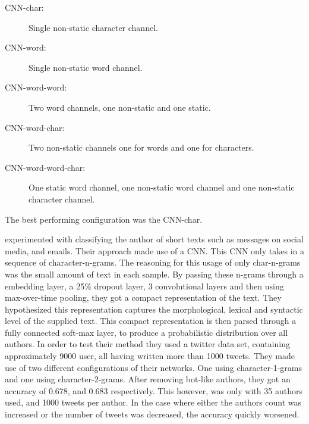 \begin{description}
    \item[CNN-char:] Single non-static character channel.
    \item[CNN-word:] Single non-static word channel.
    \item[CNN-word-word:] Two word channels, one non-static and one static.
    \item[CNN-word-char:] Two non-static channels one for words and one for
        characters.
    \item[CNN-word-word-char:] One static word channel, one non-static word
        channel and one non-static character channel.
\end{description}

The best performing configuration was the CNN-char.

\citet{shrestha2017} experimented with classifying the author of short texts
such as messages on social media, and emails. Their approach made use of a
\gls{CNN}. This \gls{CNN} only takes in a sequence of character-n-grams. The
reasoning for this usage of only char-n-grams was the small amount of text in
each sample. By passing these n-grams through a embedding layer, a 25\% dropout
layer, 3 convolutional layers and then using max-over-time pooling, they got
a compact representation of the text. They hypothesized this representation
captures the morphological, lexical and syntactic level of the supplied text.
This compact representation is then parsed through a fully connected soft-max
layer, to produce a probabilistic distribution over all authors. In order to
test their method they used a twitter data set, containing approximately 9000
user, all having written more than 1000 tweets. They made use of two different
configurations of their networks. One using character-1-grams and one using
character-2-grams. After removing bot-like authors, they got an accuracy of
0.678, and 0.683 respectively. This however, was only with 35 authors used,
and 1000 tweets per author. In the case where either the authors count was
increased or the number of tweets was decreased, the accuracy quickly worsened.

